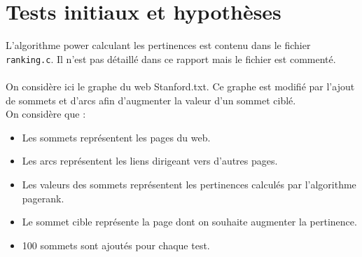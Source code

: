 \documentclass[a4paper,11pt]{article}
\begin{document}
\section{Tests initiaux et hypothèses}
	L'algorithme power calculant les pertinences est contenu dans le fichier \texttt{ranking.c}. Il n'est pas détaillé dans ce rapport mais le fichier est commenté.\\
	\\
	On considère ici le graphe du web Stanford.txt. Ce graphe est modifié par l'ajout de sommets et d'arcs afin d'augmenter la valeur d'un sommet ciblé.\\
	On considère que :\\
	\begin{itemize}
		\item Les sommets représentent les pages du web.
		\item Les arcs représentent les liens dirigeant vers d'autres pages.
		\item Les valeurs des sommets représentent les pertinences calculés par l'algorithme pagerank.
		\item Le sommet cible représente la page dont on souhaite augmenter la pertinence.
		\item 100 sommets sont ajoutés pour chaque test.
	\end{itemize}
\end{document}
